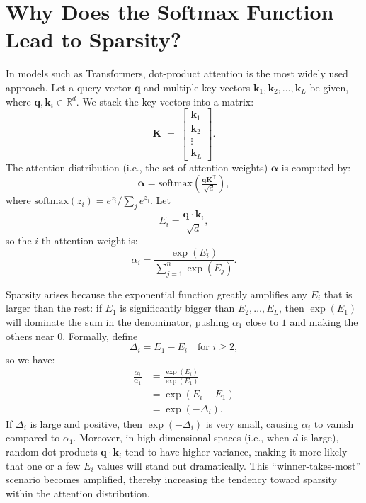 \appendix

\section{Why Does the Softmax Function Lead to Sparsity?}
\label{app:sparsity}

In models such as Transformers, dot-product attention is the most widely used approach. Let a query vector $\boldsymbol{q}$ and multiple key vectors $\boldsymbol{k}_1, \boldsymbol{k}_2, \ldots, \boldsymbol{k}_L$ be given, where $\boldsymbol{q}, \boldsymbol{k}_i \in \mathbb{R}^d$. We stack the key vectors into a matrix:
\begin{equation}
\boldsymbol{K} \;=\;
\begin{bmatrix}
\boldsymbol{k}_1 \\
\boldsymbol{k}_2 \\
\vdots \\
\boldsymbol{k}_L
\end{bmatrix}.
\end{equation}
The attention distribution (i.e., the set of attention weights) $\boldsymbol{\alpha}$ is computed by:
\begin{equation}
\boldsymbol{\alpha} = \text{softmax} \left (\tfrac{\boldsymbol{q} \boldsymbol{K}^\top}{\sqrt{d}} \right ),
\end{equation}
where $\text{softmax}(z_i) = e^{z_i} / \sum_j e^{z_j}$. Let
\begin{equation}
E_i = \frac{\boldsymbol{q}\cdot \boldsymbol{k}_i}{\sqrt{d}},
\end{equation}
so the $i$-th attention weight is:
\begin{equation}
\alpha_i = \frac{\exp(E_i)}{\sum_{j=1}^n \exp(E_j)}.
\end{equation}

Sparsity arises because the exponential function greatly amplifies any $E_i$ that is larger than the rest: if $E_1$ is significantly bigger than $E_2, \dots, E_L$, then $\exp(E_1)$ will dominate the sum in the denominator, pushing $\alpha_1$ close to $1$ and making the others near $0$. Formally, define
\begin{equation}
\Delta_i = E_1 - E_i \quad \text{for } i \ge 2,
\end{equation}
so we have:
\begin{equation}
\begin{aligned}
\frac{\alpha_i}{\alpha_1} &= \frac{\exp(E_i)}{\exp(E_1)} \\
                          &= \exp (E_i - E_1 ) \\
                          &= \exp (-\Delta_i ).
\end{aligned}
\end{equation}
If $\Delta_i$ is large and positive, then $\exp(-\Delta_i)$ is very small, causing $\alpha_i$ to vanish compared to $\alpha_1$. Moreover, in high-dimensional spaces (i.e., when $d$ is large), random dot products $\boldsymbol{q} \cdot \boldsymbol{k}_i$ tend to have higher variance, making it more likely that one or a few $E_i$ values will stand out dramatically. This ``winner-takes-most'' scenario becomes amplified, thereby increasing the tendency toward sparsity within the attention distribution.

